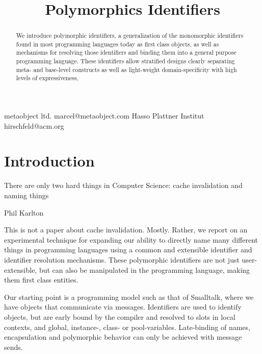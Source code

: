 \documentclass[preprint,authoryear,10pt]{sigplanconf}
\begin{document}


\title{Polymorphics Identifiers}

           {metaobject ltd.}
           {marcel@metaobject.com}
           {Hasso Plattner Institut}
           {hirschfeld@acm.org}

\maketitle

\begin{abstract}
We introduce polymorphic identifiers, a generalization of the monomorphic identifiers found in most
programming languages today as first class objects, as well as mechanisms for
resolving those identifiers and binding them into a general purpose programming language.
These identifiers allow stratified designs clearly separating meta- and base-level constructs
as well as light-weight domain-specificity with high levels of expressiveness, 
\end{abstract}


\terms 
\keywords
\setlength{\epigraphrule}{0pt}


\section{Introduction}
\epigraph{There are only two hard things in Computer Science:  cache invalidation and naming things} {Phil Karlton}

This is not a paper about cache invalidation.  Mostly.   Rather, we report on an experimental
technique for expanding our ability to directly name many different things in 
programming languages using a common and extensible identifier and identifier resolution
mechanisms.
These polymorphic identifiers are not just user-extensible,
but can also be manipulated in the programming language, making them first class 
entities.

Our starting point is a programming model such as that of Smalltalk, where we have objects
that communicate via messages\cite{Goldberg1983}.   Identifiers are used to identify 
objects, but are early bound by the compiler and resolved to slots in local contexts, and 
global, instance-, class- or pool-variables.  Late-binding of names, encapsulation and
polymorphic behavior can only be achieved with message sends.
\end{document}

